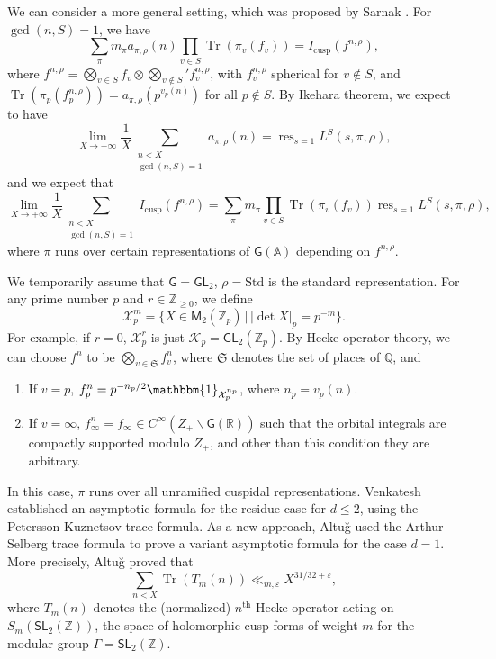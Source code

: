 \documentclass[10pt,oneside,reqno]{amsart}
\newcommand\cK{\mathcal{K}}
\newcommand\cX{\mathcal{X}}
\renewcommand\AA{\mathbb{A}}
\newcommand\QQ{\mathbb{Q}}
\newcommand\RR{\mathbb{R}}
\newcommand\ZZ{\mathbb{Z}}
\newcommand\mf[1]{\mathfrak{#1}}
\newcommand\G{\mathsf{G}}
\newcommand\M{\mathsf{M}}
\newcommand\SL{\mathsf{SL}}
\newcommand\GL{\mathsf{GL}}
\newcommand\triv{\mathbbm{1}}
\newcommand\bs{\backslash}
\DeclareMathOperator\Tr{Tr}
\DeclareMathOperator\res{res}
\renewcommand\leq{\leqslant}
\renewcommand\geq{\geqslant}
\theoremstyle{THEOREM}
\theoremstyle{DEFINITION}
\theoremstyle{EXERCISE}
\numberwithin{equation}{section}
\begin{document}
We can consider a more general setting, which was proposed by Sarnak \cite{sarnak2001}. For $\gcd(n,S)=1$, we have
\[
\sum_{\pi}m_\pi a_{\pi,\rho}(n)\prod_{v\in S}\Tr(\pi_v(f_v))=I_{\mathrm{cusp}}(f^{n,\rho}),
\]
where $f^{n,\rho}=\bigotimes_{v\in S}f_v\otimes\bigotimes_{v\notin S}'f_v^{n,\rho}$, with $f_v^{n,\rho}$ spherical for $v\notin S$, and $\Tr(\pi_p(f_p^{n,\rho}))=a_{\pi,\rho}(p^{v_p(n)})$ for all $p\notin S$. By Ikehara theorem, we expect to have
\[
\lim_{X\to +\infty}\frac{1}{X}\sum_{\substack{n<X\\ \gcd(n,S)=1}}a_{\pi,\rho}(n)=\res_{s=1}L^S(s,\pi,\rho),
\]
and we expect that
\[
\lim_{X\to +\infty}\frac{1}{X}\sum_{\substack{n<X\\ \gcd(n,S)=1}}I_{\mathrm{cusp}}(f^{n,\rho})=\sum_{\pi}m_\pi \prod_{v\in S}\Tr(\pi_v(f_v))\res_{s=1}L^S(s,\pi,\rho),
\]
where $\pi$ runs over certain representations of $\G(\AA)$ depending on $f^{n,\rho}$. 

We temporarily assume that $\G=\GL_2$, $\rho=\mathrm{Std}$ is the standard representation.
For any prime number $p$ and $r\in \ZZ_{\geq 0}$, we define
\[
\cX_p^{m}=\{X\in \M_2(\ZZ_p)\,|\, \mathopen{|}\det X\mathclose{|}_p = p^{-m}\}.
\]
For example, if $r=0$, $\cX_p^{r}$ is just $\cK_p=\GL_2(\ZZ_p)$. By Hecke operator theory, we can choose $f^{n}$ to be $\bigotimes_{v\in \mf{S}}f^{n}_v$, where $\mf{S}$ denotes the set of places of $\QQ$, and
\begin{enumerate}[itemsep=0pt,parsep=0pt,topsep=2pt,leftmargin=0pt,labelsep=3pt,itemindent=9pt,label=\textbullet]
  \item If $v=p$, $f^{n}_p=p^{-n_p/2}\triv_{\cX_p^{n_p}}$, where $n_p=v_p(n)$.
  \item If $v=\infty$,  $f^{n}_\infty=f_\infty\in C^\infty(Z_+\bs \G(\RR))$ such that the orbital integrals are compactly supported modulo $Z_+$, and other than this condition they are arbitrary.
\end{enumerate}
In this case, $\pi$ runs over all unramified cuspidal representations. Venkatesh \cite{venkatesh2002,venkatesh2004} established an asymptotic formula for the residue case for $d\leq 2$, using the Petersson-Kuznetsov trace formula.
As a new approach, Altu\u{g} \cite{altug2015,altug2017,altug2020} used the Arthur-Selberg trace formula to prove a variant asymptotic formula for the case $d=1$. More precisely, Altu\u{g} proved that
\[
\sum_{n<X}\Tr(T_m(n))\ll_{m,\varepsilon} X^{31/32+\varepsilon},
\]
where $T_m(n)$ denotes the (normalized) $n^{\mathrm{th}}$ Hecke operator acting on $S_m(\SL_2(\ZZ))$, the space of holomorphic cusp forms of weight $m$ for the modular group $\Gamma=\SL_2(\ZZ)$.
\end{document}
